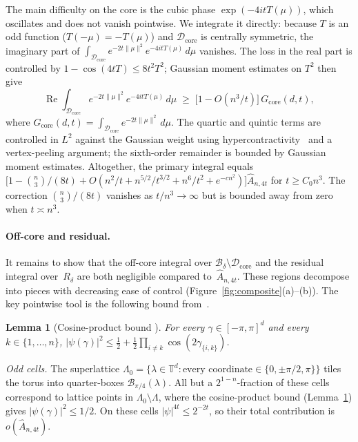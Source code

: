 \documentclass[11pt]{article}
\newtheorem{lemma}[theorem]{Lemma}
\theoremstyle{definition}
\newcommand{\TT}{\mathbb{T}}
\newcommand{\Bbox}{\mathcal{B}}
\newcommand{\corereg}{\mathcal{D}_\mathrm{core}}
\newcommand{\RePart}{\operatorname{Re}}
\newcommand{\core}{G_{\mathrm{core}}}
\newcommand{\Ahat}{\hat A_{n,4t}}
\begin{document}
The main difficulty on the core is the cubic phase \(\exp(-4itT(\mu))\), which oscillates and does not vanish pointwise. We integrate it directly: because \(T\) is an odd function (\(T(-\mu)=-T(\mu)\)) and \(\corereg\) is centrally symmetric, the imaginary part of \(\int_{\corereg}e^{-2t\|\mu\|^2}e^{-4itT(\mu)}\,d\mu\) vanishes. The loss in the real part is controlled by \(1-\cos(4tT)\le 8t^2T^2\); Gaussian moment estimates on \(T^2\) then give
\[
  \RePart\int_{\corereg}e^{-2t\|\mu\|^2}e^{-4itT(\mu)}\,d\mu
  \;\ge\;
  \bigl[1-O(n^3/t)\bigr]\,\core(d,t),
\]
where \(\core(d,t)=\int_{\corereg}e^{-2t\|\mu\|^2}\,d\mu\). The quartic and quintic terms are controlled in \(L^2\) against the Gaussian weight using hypercontractivity~\cite[Theorem~9.22]{ODo2014} and a vertex-peeling argument; the sixth-order remainder is bounded by Gaussian moment estimates. Altogether, the primary integral equals \(\bigl[1-\binom{n}{3}/(8t)+O(n^2/t+n^{5/2}/t^{3/2}+n^6/t^2+e^{-cn^2})\bigr]\Ahat\) for \(t\ge C_0n^3\). The correction \(\binom{n}{3}/(8t)\) vanishes as \(t/n^3\to\infty\) but is bounded away from zero when \(t\asymp n^3\).

\paragraph{Off-core and residual.}
It remains to show that the off-core integral over \(\Bbox_\delta\setminus\corereg\) and the residual integral over~\(R_\delta\) are both negligible compared to~\(\Ahat\). These regions decompose into pieces with decreasing ease of control (Figure~\ref{fig:composite}(a)--(b)). The key pointwise tool is the following bound from~\cite{DL10}.

\begin{lemma}[Cosine-product bound {\cite[Lemma~3.1]{DL10}}]\label{fact:psi-sq}
For every \(\gamma\in[-\pi,\pi]^d\) and every \(k\in\{1,\dots,n\}\),
\(|\psi(\gamma)|^2\le \frac12+\frac12\prod_{i\ne k}\cos(2\gamma_{\{i,k\}})\).
\end{lemma}

\emph{Odd cells.} The superlattice \(\Lambda_0=\{\lambda\in\TT^d:\text{every coordinate}\in\{0,\pm\pi/2,\pi\}\}\) tiles the torus into quarter-boxes \(\Bbox_{\pi/4}(\lambda)\). All but a \(2^{1-n}\)-fraction of these cells correspond to lattice points in \(\Lambda_0\setminus\Lambda\), where the cosine-product bound (Lemma~\ref{fact:psi-sq}) gives \(|\psi(\gamma)|^2\le 1/2\). On these cells \(|\psi|^{4t}\le 2^{-2t}\), so their total contribution is \(o(\Ahat)\).
\end{document}
